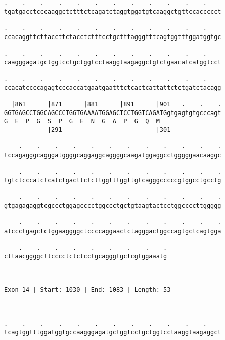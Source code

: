 \documentclass{article}
\begin{document}
\begin{Verbatim}
.    .    .    .    .    .    .    .    .    .    .    .    
tgatgacctcccaaggctctttctcagatctaggtggatgtcaaggctgttccaccccct
                                                            
.    .    .    .    .    .    .    .    .    .    .    .    
ccacaggttcttaccttctacctctttcctgctttagggtttcagtggtttggatggtgc
                                                            
.    .    .    .    .    .    .    .    .    .    .    .    
caagggagatgctggtcctgctggtcctaaggtaagaggctgtctgaacatcatggtcct
                                                            
.    .    .    .    .    .    .    .    .    .    .    .    
ccacatccccagagtcccaccatgaatgaatttctcactcattattctctgatctacagg
                                                            
  |861      |871      |881      |891      |901   .    .    .
GGTGAGCCTGGCAGCCCTGGTGAAAATGGAGCTCCTGGTCAGATGgtgagtgtgcccagt
G  E  P  G  S  P  G  E  N  G  A  P  G  Q  M                 
            |291                          |301              
  
    .    .    .    .    .    .    .    .    .    .    .    .
tccagagggcagggatggggcaggaggcaggggcaagatggaggcctgggggaacaaggc
                                                            
    .    .    .    .    .    .    .    .    .    .    .    .
tgtctcccatctcatctgacttctcttggtttggttgtcagggcccccgtggcctgcctg
                                                            
    .    .    .    .    .    .    .    .    .    .    .    .
gtgagagaggtcgccctggagcccctggccctgctgtaagtactcctggccccttggggg
                                                            
    .    .    .    .    .    .    .    .    .    .    .    .
atccctgagctctggaaggggctccccaggaactctagggactggccagtgctcagtgga
                                                            
    .    .    .    .    .    .    .    .    .
cttaacggggcttcccctctctcctgcagggtgctcgtggaaatg
                                             
                                             
 
Exon 14 | Start: 1030 | End: 1083 | Length: 53



.    .    .    .    .    .    .    .    .    .    .    .    
tcagtggtttggatggtgccaagggagatgctggtcctgctggtcctaaggtaagaggct
                                                            

\end{Verbatim}
\end{document}
